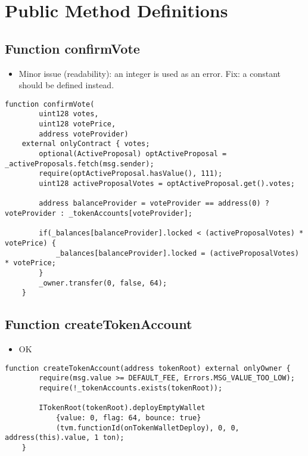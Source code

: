 \section{Public Method Definitions}

\subsection{Function confirmVote}

\begin{itemize}
\item Minor issue (readability): an integer is used as an error. Fix:
  a constant should be defined instead.
\end{itemize}

\begin{lstlisting}[firstnumber=89]
    function confirmVote(
        uint128 votes,
        uint128 votePrice,
        address voteProvider)
    external onlyContract { votes;
        optional(ActiveProposal) optActiveProposal = _activeProposals.fetch(msg.sender);
        require(optActiveProposal.hasValue(), 111);
        uint128 activeProposalVotes = optActiveProposal.get().votes;

        address balanceProvider = voteProvider == address(0) ? voteProvider : _tokenAccounts[voteProvider];

        if(_balances[balanceProvider].locked < (activeProposalVotes) * votePrice) {
            _balances[balanceProvider].locked = (activeProposalVotes) * votePrice;
        }
        _owner.transfer(0, false, 64);
    }
\end{lstlisting}

\subsection{Function createTokenAccount}

\begin{itemize}
\item OK
\end{itemize}

\begin{lstlisting}[firstnumber=228]
    function createTokenAccount(address tokenRoot) external onlyOwner {
        require(msg.value >= DEFAULT_FEE, Errors.MSG_VALUE_TOO_LOW);
        require(!_tokenAccounts.exists(tokenRoot));

        ITokenRoot(tokenRoot).deployEmptyWallet
            {value: 0, flag: 64, bounce: true}
            (tvm.functionId(onTokenWalletDeploy), 0, 0, address(this).value, 1 ton);
    }
\end{lstlisting}

